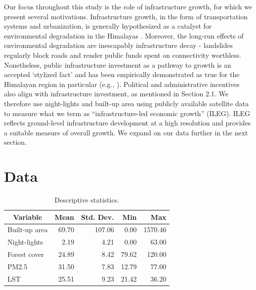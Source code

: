 \documentclass[a4paper,12pt]{article}
\begin{document}
Our focus throughout this study is the role of infrastructure growth, for which we present several motivations. Infrastructure growth, in the form of transportation systems and urbanization, is generally hypothesized as a catalyst for environmental degradation in the Himalayas \parencite{prashar2023,singh2005}. Moreover, the long-run effects of environmental degradation are inescapably infrastructure decay - landslides regularly block roads \parencite{mey2023} and render public funds spent on connectivity worthless. Nonetheless, public infrastructure investment as a pathway to growth is an accepted ‘stylized fact’ and has been empirically demonstrated as true for the Himalayan region in particular (e.g., \cite{tiwari2000}). Political and administrative incentives also align with infrastructure investment, as mentioned in Section 2.1. We therefore use night-lights and built-up area using publicly available satellite data to measure what we term as “infrastructure-led economic growth” (ILEG). ILEG reflects ground-level infrastructure development at a high resolution and provides a suitable measure of overall growth. We expand on our data further in the next section.


\section{Data}

\begin{table}[b]
    \centering
    \begin{tabular}{|l|r|r|r|r|}
    \hline
    \multicolumn{1}{|c|}{\textbf{Variable}} & \multicolumn{1}{c|}{\textbf{Mean}} & \multicolumn{1}{c|}{\textbf{Std. Dev.}} & \textbf{Min} & \textbf{Max} \\ \hline
    Built-up area                           & 69.70                             & 107.06                                  & 0.00            & 1570.46      \\ \hline
    Night-lights                            & 2.19                              & 4.21                                   & 0.00            & 63.00           \\ \hline
    Forest cover                            & 24.89                              & 8.42                                    & 79.62        & 120.00          \\ \hline
    PM2.5                                   & 31.50                              & 7.83                                    & 12.79        & 77.00           \\ \hline
    LST                                     & 25.51                             & 9.23                                   & 21.42       & 36.20       \\ \hline
    \end{tabular}
    \caption{Descriptive statistics.}
\end{table}
\end{document}
